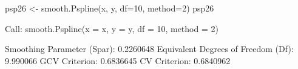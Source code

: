 \begin{Schunk}
\begin{Sinput}
 psp26 <- smooth.Pspline(x, y, df=10, method=2)
 psp26
\end{Sinput}
\begin{Soutput}
Call:
smooth.Pspline(x = x, y = y, df = 10, method = 2)

Smoothing Parameter (Spar): 0.2260648 
Equivalent Degrees of Freedom (Df): 9.990066 
GCV Criterion: 0.6836645 
CV  Criterion: 0.6840962 
\end{Soutput}
\end{Schunk}
